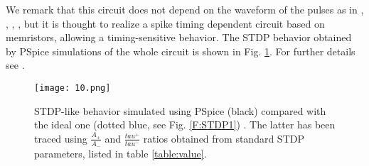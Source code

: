 \documentclass[review]{elsarticle}
\begin{document}
 

We remark that this circuit does not depend on the waveform of the pulses as in  \cite{ZamarrenoRamos2011}, \cite{Wu2015}, \cite{Serrano2012}, \cite{XWu2015}, but it is thought to realize a spike timing dependent circuit based on memristors, allowing a timing-sensitive behavior. The STDP behavior obtained by PSpice simulations of the whole circuit is shown in Fig. \ref{STDPb}. For further details see \cite{prime2016}. 
\begin{figure}[!htbp]
\centering
\texttt{[image: 10.png]}
\caption{STDP-like behavior simulated using PSpice (black) compared with the ideal one (dotted blue, see Fig. \ref{F:STDP1}) . The latter has been traced using $\frac{A_{+}}{A_{-}}$ and $\frac{tau^{+}}{tau^{-}}$ ratios obtained from standard STDP parameters, listed in table \ref{table:value}. }
\label{STDPb}
\end{figure}
\end{document}
